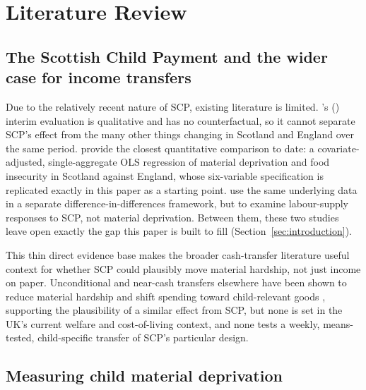 \section{Literature Review}
\label{sec:literature-review}

\subsection{The Scottish Child Payment and the wider case for income transfers}
\label{sec:lit-scp}

Due to the relatively recent nature of SCP, existing literature is limited. \citeauthor{scottishgovernment2022}'s (\citeyear{scottishgovernment2022}) interim evaluation is qualitative and has no counterfactual, so it cannot separate SCP's effect from the many other things changing in Scotland and England over the same period. \citet{andersen2025} provide the closest quantitative comparison to date: a covariate-adjusted, single-aggregate OLS regression of material deprivation and food insecurity in Scotland against England, whose six-variable specification is replicated exactly in this paper as a starting point. \citet{nesom2025} use the same underlying data in a separate difference-in-differences framework, but to examine labour-supply responses to SCP, not material deprivation. Between them, these two studies leave open exactly the gap this paper is built to fill (Section~\ref{sec:introduction}).

This thin direct evidence base makes the broader cash-transfer literature useful context for whether SCP could plausibly move material hardship, not just income on paper. Unconditional and near-cash transfers elsewhere have been shown to reduce material hardship and shift spending toward child-relevant goods \citep{haushofershapiro2016,forget2011,greggwaldfogelwashbrook2006}, supporting the plausibility of a similar effect from SCP, but none is set in the UK's current welfare and cost-of-living context, and none tests a weekly, means-tested, child-specific transfer of SCP's particular design.

\subsection{Measuring child material deprivation}
\label{sec:lit-measurement}

